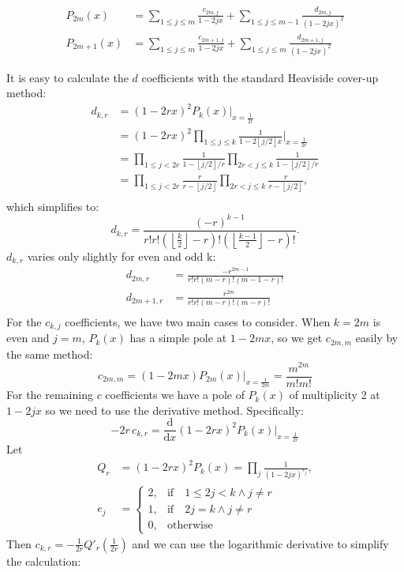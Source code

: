 \documentclass[a4paper]{amsart}
\newcommand{\floor}[1]{\left\lfloor #1 \right\rfloor}
\begin{document}
\begin{equation}\label{pkx}
    \begin{aligned}
    P_{2m}(x) &= \sum_{1 \leq j \leq m} \frac{c_{2m,j}}{1-2jx} + \sum_{1 \leq j \leq m-1} \frac{d_{2m,j}}{(1-2jx)^2} \\
    P_{2m+1}(x) &= \sum_{1 \leq j \leq m} \frac{c_{2m+1,j}}{1-2jx} + \sum_{1 \leq j \leq m} \frac{d_{2m+1,j}}{(1-2jx)^2}
    \end{aligned}
\end{equation}

It is easy to calculate the $d$ coefficients with the standard Heaviside cover-up method:
$$
\begin{aligned}
    d_{k,r} &= (1-2rx)^2P_k(x)|_{x=\frac{1}{2r}} \\
    &= (1-2rx)^2 \prod_{1 \leq j \leq k} \frac{1}{1-2 \floor{j/2}x} \bigg|_{x=\frac{1}{2r}} \\
    &= \prod_{1 \leq j < 2r} \frac{1}{1-\floor{j/2}/r} \prod_{2r < j \leq k} \frac{1}{1- \floor{j/2}/r} \\
    &= \prod_{1 \leq j < 2r} \frac{r}{r-\floor{j/2}} \prod_{2r < j \leq k} \frac{r}{r- \floor{j/2}}, \\
\end{aligned}
$$
which simplifies to:
\begin{equation}\label{d-k-r}
        d_{k,r}=\frac{(-r)^{k-1}}{r!r!(\floor{\frac{k}{2}}-r)!(\floor{\frac{k-1}{2}}-r)!}.
\end{equation}
$d_{k,r}$ varies only slightly for even and odd k:
$$
\begin{aligned}
    d_{2m,r} &= \frac{-r^{2m-1}}{r!r!(m-r)!(m-1-r)!} \\
    d_{2m+1,r} &= \frac{r^{2m}}{r!r!(m-r)!(m-r)!} \\
\end{aligned}
$$
For the $c_{k,j}$ coefficients, we have two main cases to consider. When $k=2m$ is even and $j=m$, $P_k(x)$ has a simple pole at $1-2mx$, so we get $c_{2m,m}$ easily by the same method:
\begin{equation}\label{c-2m-m}
    c_{2m,m} = (1-2mx)P_{2m}(x)|_{x=\frac{1}{2m}} = \frac{m^{2m}}{m!m!}
\end{equation}
For the remaining $c$ coefficients  we have a pole of $P_k(x)$ of multiplicity 2 at $1-2jx$ so we need to use the derivative method. Specifically:
$$
-2r\,c_{k,r} = \frac{\mathrm{d}}{\mathrm{d}x} (1-2rx)^2P_k(x)\bigg|_{x=\frac{1}{2r}}
$$
Let 
$$
\begin{aligned}
Q_r &= (1-2rx)^2 P_k(x) = \prod_{j} \frac{1}{(1-2jx)^{e_j}},\\
e_j &= 
    \begin{cases} 
    2,& \mathrm{if}\quad 1 \leq 2j < k \land  j \neq r \\ 
    1, & \mathrm{if} \quad 2j = k \land j \neq r \\
    0, & \mathrm{otherwise}
    \end{cases}
\end{aligned}
$$
Then $c_{k,r} = -\frac{1}{2r}Q'_r\left (\frac{1}{2r} \right)$ and we can use the logarithmic derivative to simplify the calculation:
\end{document}
